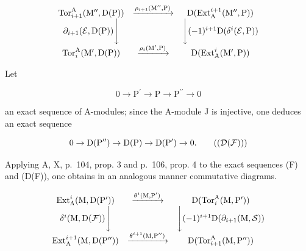 \[
\begin{array}{c c c} \operatorname{Tor} _ {i + 1} ^ {\mathrm{A}} (\mathrm{M} ^ {\prime \prime}, \mathrm{D} (\mathrm{P})) & \xrightarrow {\rho_ {i + 1} (\mathrm{M} ^ {\prime \prime} , \mathrm{P})} & \mathrm{D} (\operatorname{Ext} _ {\mathrm{A}} ^ {i + 1} (\mathrm{M} ^ {\prime \prime}, \mathrm{P})) \\ \partial_ {i + 1} (\mathcal {E}, \mathrm{D} (\mathrm{P})) \Bigg \downarrow & & \Bigg \downarrow (- 1) ^ {i + 1} \mathrm{D} (\delta^ {i} (\mathcal {E}, \mathrm{P})) \\ \operatorname{Tor} _ {i} ^ {\mathrm{A}} (\mathrm{M} ^ {\prime}, \mathrm{D} (\mathrm{P})) & \xrightarrow {\rho_ {i} (\mathrm{M} ^ {\prime} , \mathrm{P})} & \mathrm{D} (\operatorname{Ext} _ {\mathrm{A}} ^ {i} (\mathrm{M} ^ {\prime}, \mathrm{P})) \end{array}
\]

Let

\[
0 \to \mathrm{P} ^ {\prime} \to \mathrm{P} \to \mathrm{P} ^ {\prime \prime} \to 0\tag{F}
\]

an exact sequence of A-modules; since the A-module J is injective, one deduces an exact sequence

\[
0 \to \mathrm{D} (\mathrm{P} ^ {\prime \prime}) \to \mathrm{D} (\mathrm{P}) \to \mathrm{D} (\mathrm{P} ^ {\prime}) \to 0.\tag{\(\left(\mathcal{D}(\mathcal{F})\right)\)}
\]

Applying A, X, p.~104, prop. 3 and p.~106, prop. 4 to the exact sequences (F) and (D(F)), one obtains in an analogous manner commutative diagrams.

\[
\begin{array}{c c c} \operatorname{Ext} _ {\Lambda} ^ {i} (\mathrm{M}, \mathrm{D} (\mathrm{P} ^ {\prime})) & \xrightarrow {\theta^ {i} (\mathrm{M} , \mathrm{P} ^ {\prime})} & \mathrm{D} (\operatorname{Tor} _ {i} ^ {\mathrm{A}} (\mathrm{M}, \mathrm{P} ^ {\prime})) \\ \delta^ {i} (\mathrm{M}, \mathrm{D} (\mathcal {F})) \Bigg \downarrow & & \Bigg \downarrow (- 1) ^ {i + 1} \mathrm{D} (\partial_ {i + 1} (\mathrm{M}, \mathcal {S})) \\ \operatorname{Ext} _ {\mathrm{A}} ^ {i + 1} (\mathrm{M}, \mathrm{D} (\mathrm{P} ^ {\prime \prime})) & \xrightarrow {\theta^ {i + 1} (\mathrm{M} , \mathrm{P} ^ {\prime \prime})} & \mathrm{D} (\operatorname{Tor} _ {i + 1} ^ {\mathrm{A}} (\mathrm{M}, \mathrm{P} ^ {\prime \prime})) \end{array}
\]


